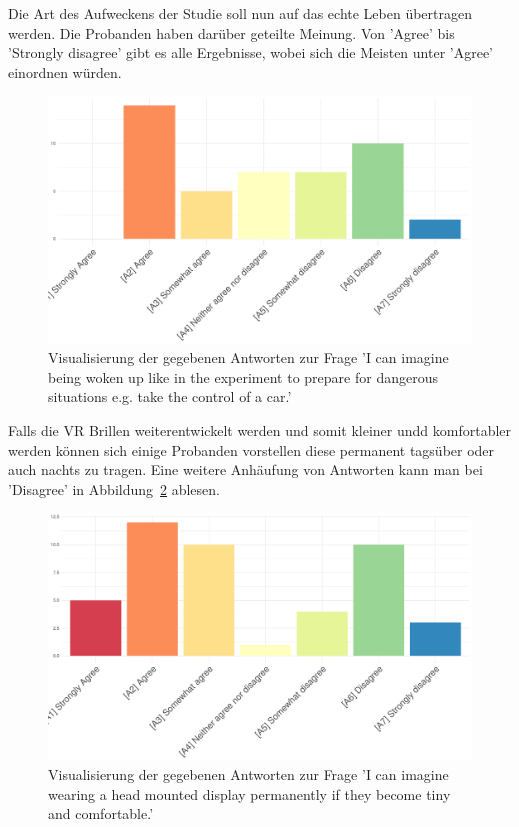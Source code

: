 Die Art des Aufweckens der Studie soll nun auf das echte Leben übertragen werden. Die Probanden haben darüber geteilte Meinung. Von 'Agree' bis 'Strongly disagree' gibt es alle Ergebnisse, wobei sich die Meisten unter 'Agree' einordnen würden.

\begin{figure}[H]
	\centering
	\includegraphics[width=\textwidth]{./_StudyResults/imagineWakingUp}
	\caption{Visualisierung der gegebenen Antworten zur Frage 'I can imagine being woken up like in the experiment to prepare for dangerous situations e.g. take the control of a car.'}
	\label{fig:imagineWakingUp}
\end{figure}

Falls die VR Brillen weiterentwickelt werden und somit kleiner undd komfortabler werden können sich einige Probanden vorstellen diese permanent tagsüber oder auch nachts zu tragen. Eine weitere Anhäufung von Antworten kann man bei 'Disagree' in Abbildung~\ref{fig:permanentWearing} ablesen. 

\begin{figure}[H]
	\centering
	\includegraphics[width=\textwidth]{./_StudyResults/permanentWearing}
	\caption{Visualisierung der gegebenen Antworten zur Frage 'I can imagine wearing a head mounted display permanently if they become tiny and comfortable.'}
	\label{fig:permanentWearing}
\end{figure}
